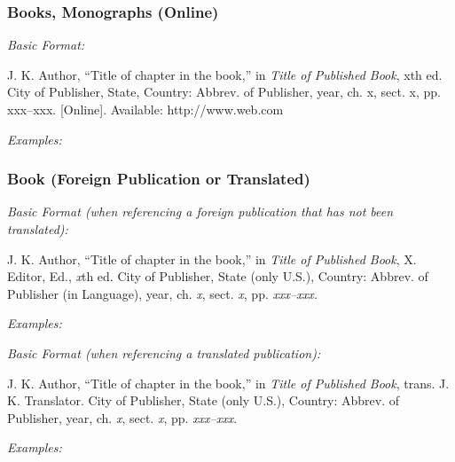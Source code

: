 \documentclass[10pt]{article}
\newcommand*{\guidelabel}[1]{\par\vspace{-4pt}\hspace*{22pt}\textit{#1}\par\vspace{-\parskip}}
\begin{document}
\subsubsection{Books, Monographs (Online)}
\guidelabel{Basic Format:}
\begin{guideitems}
  \item J. K. Author, “Title of chapter in the book,” in \textit{Title of Published Book}, xth ed. City of Publisher, State, Country: Abbrev. of Publisher, year, ch. x, sect. x, pp. xxx–xxx. [Online]. Available: http://www.web.com
\end{guideitems}
\guidelabel{Examples:}
\begin{guideitems}
  \item {}
  \item {}
  \item {}
\end{guideitems}

\subsubsection{Book (Foreign Publication or Translated)}
\guidelabel{Basic Format (when referencing a foreign publication that has not been translated):}
\begin{guideitems}
  \item J. K. Author, “Title of chapter in the book,” in \textit{Title of Published Book}, X. Editor, Ed., \textit{x}th ed. City of Publisher, State (only U.S.), Country: Abbrev. of Publisher (in Language), year, ch. \textit{x}, sect. \textit{x}, pp. \textit{xxx–xxx.}
\end{guideitems}
\guidelabel{Examples:}
\begin{guideitems}
  \item {}
  \item {}
\end{guideitems}
\guidelabel{Basic Format (when referencing a translated publication):}
\begin{guideitems}
  \item J. K. Author, “Title of chapter in the book,” in \textit{Title of Published Book}, trans. J. K. Translator. City of Publisher, State (only U.S.), Country: Abbrev. of Publisher, year, ch. \textit{x}, sect. \textit{x}, pp. \textit{xxx–xxx}.
\end{guideitems}
\guidelabel{Examples:}
\begin{guideitems}
  \item {}
  \item {}
\end{guideitems}
\end{document}
